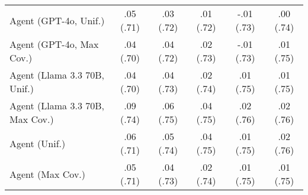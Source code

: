 \begin{table}[h!]
\begin{tabular}{lccccc}
    Agent (GPT-4o, Unif.) & .05 {\small (.71)} & .03 {\small (.72)} & .01 {\small (.72)} & -.01 {\small (.73)} & .00 {\small (.74)} \\
    Agent (GPT-4o, Max Cov.) & .04 {\small (.70)} & .04 {\small (.72)} & .02 {\small (.73)} & -.01 {\small (.73)} & .01 {\small (.75)} \\
    Agent (Llama 3.3 70B, Unif.) & .04 {\small (.70)} & .04 {\small (.73)} & .02 {\small (.74)} & .01 {\small (.75)} & .01 {\small (.75)} \\
    Agent (Llama 3.3 70B, Max Cov.) & \cellcolor{silver!30}.09 {\small (.74)} & \cellcolor{silver!30}.06 {\small (.75)} & \cellcolor{bronze!30}.04 {\small (.75)} & \cellcolor{gold!30}.02 {\small (.76)} & \cellcolor{silver!30}.02 {\small (.76)} \\
    Agent (Unif.) & .06 {\small (.71)} & .05 {\small (.74)} & \cellcolor{bronze!30}.04 {\small (.75)} & .01 {\small (.75)} & .02 {\small (.76)} \\
    Agent (Max Cov.) & .05 {\small (.71)} & .04 {\small (.73)} & .02 {\small (.74)} & .01 {\small (.75)} & .01 {\small (.75)} \\
    \bottomrule
    \end{tabular}
\end{table}